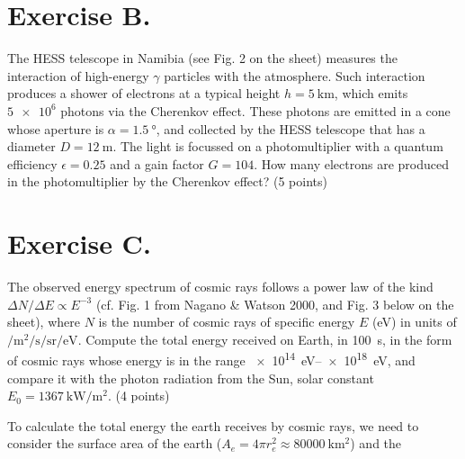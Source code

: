 \documentclass[11pt,a4paper,twoside]{article}
\begin{document}
\section*{Exercise B.} 
The HESS telescope in Namibia (see Fig. 2 on the sheet) measures the
interaction of high-energy $\gamma$ particles with the atmosphere. Such
interaction produces a shower of electrons at a typical height $h =
\SI{5}{\kilo\meter}$, which emits $\num{5e6}$ photons via the Cherenkov
effect. These photons are emitted in a cone whose aperture is $\alpha =
\SI{1.5}{\degree}$, and collected by the HESS telescope that has a diameter $D
= \SI{12}{\meter}$. The light is focussed on a photomultiplier with a quantum
efficiency $\epsilon = 0.25$ and a gain factor $G = 104$.  How many electrons
are produced in the photomultiplier by the Cherenkov effect? (5 points) \\



\section*{Exercise C.} 
The observed energy spectrum of cosmic rays follows a power law of the kind
$\Delta N/\Delta E \propto E^{-3}$ (cf. Fig. 1 from Nagano \& Watson 2000, and
Fig. 3 below on the sheet), where $N$ is the number of cosmic rays of specific
energy $E$ (\si{\electronvolt}) in units of
$\si{\per\meter\squared\per\second\per\steradian\per\electronvolt}$.
Compute the total energy received on Earth, in \SI{100}{\second}, in the form
of cosmic rays whose energy is in the range \SIrange{e14}{e18}{\electronvolt},
and compare it with the photon radiation from the Sun, solar constant $E_0 =
\SI{1367}{\kilo\watt\per\meter\squared}$. (4 points)

To calculate the total energy the earth receives by cosmic rays, we need to
consider the surface area of the earth ($A_e = 4\pi r_e^2 \approx
\SI{80000}{\kilo\meter\squared}$) and the 
\end{document}
